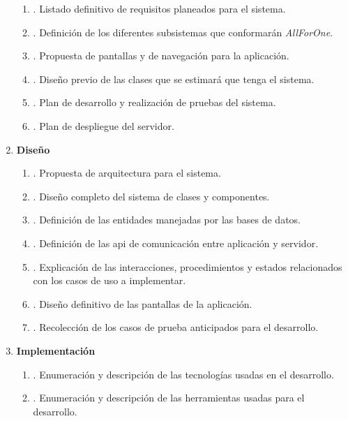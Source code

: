 \begin{enumerate}
\begin{enumerate}
    	\item \textbf{}. Listado definitivo de requisitos planeados para el sistema.
    	\item \textbf{}. Definición de los diferentes subsistemas que conformarán \emph{AllForOne}.
    	\item \textbf{}. Propuesta de pantallas y de navegación para la aplicación.
    	\item \textbf{}. Diseño previo de las clases que se estimará que tenga el sistema.
    	\item \textbf{}. Plan de desarrollo y realización de pruebas del sistema.
    	\item \textbf{}. Plan de despliegue del servidor.
	\end{enumerate}
    \item \textbf{Diseño}
    \begin{enumerate}
    	\item \textbf{}. Propuesta de arquitectura para el sistema.
    	\item \textbf{}. Diseño completo del sistema de clases y componentes.
    	\item \textbf{}. Definición de las entidades manejadas por las bases de datos.
    	\item \textbf{}. Definición de las \acrshort{api} de comunicación entre aplicación y servidor.
    	\item \textbf{}. Explicación de las interacciones, procedimientos y estados relacionados con los casos de uso a implementar.
    	\item \textbf{}. Diseño definitivo de las pantallas de la aplicación.
    	\item \textbf{}. Recolección de los casos de prueba anticipados para el desarrollo.
	\end{enumerate}
    \item \textbf{Implementación}
    \begin{enumerate}
    	\item \textbf{}. Enumeración y descripción de las tecnologías usadas en el desarrollo.
    	\item \textbf{}. Enumeración y descripción de las herramientas usadas para el desarrollo.

\end{enumerate}
\end{enumerate}
